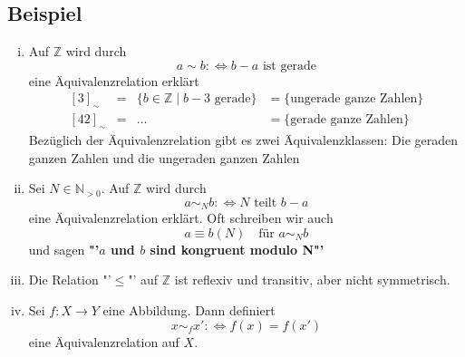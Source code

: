 \subsection{Beispiel} %
\label{sub:beispiel}
\begin{enumerate}[(i)]
	\item Auf $\mathds{Z}$ wird durch 
	\[
		a \sim b :\Leftrightarrow b-a \text{ ist gerade}
	\]
	eine Äquivalenzrelation erklärt
	\[
		\begin{array}{clcl}
		{[3]}_\sim & =  & \{ b \in \mathds{Z} \mid b-3 \text{ gerade} \} & = \{ \text{ungerade ganze Zahlen}\} \\
		{[42]}_\sim & = & \ldots & = \{ \text{gerade ganze Zahlen}\}
		\end{array}
	\]
	Bezüglich der Äquivalenzrelation gibt es zwei Äquivalenzklassen: Die geraden ganzen Zahlen und die ungeraden ganzen
	Zahlen
	\item Sei $N \in \mathds{N}_{>0}$. Auf $\mathds{Z}$ wird durch
	\[
		a \sim_N b :\Leftrightarrow N \text{ teilt } b-a
	\]
	eine Äquivalenzrelation erklärt. Oft schreiben wir auch
	\[
		a \equiv b(N) \quad \text{für } a \sim_N b
	\]
	und sagen \textbf{"'$a$ und $b$ sind kongruent modulo N"'}
	\item Die Relation "'$\le$"' auf $\mathds{Z}$ ist reflexiv und transitiv, aber nicht symmetrisch.
	\item Sei $f: X \to Y$ eine Abbildung. Dann definiert
	\[
		x \sim_f x' :\Leftrightarrow f(x)=f(x')
	\]
	eine Äquivalenzrelation auf $X$.
\end{enumerate}

